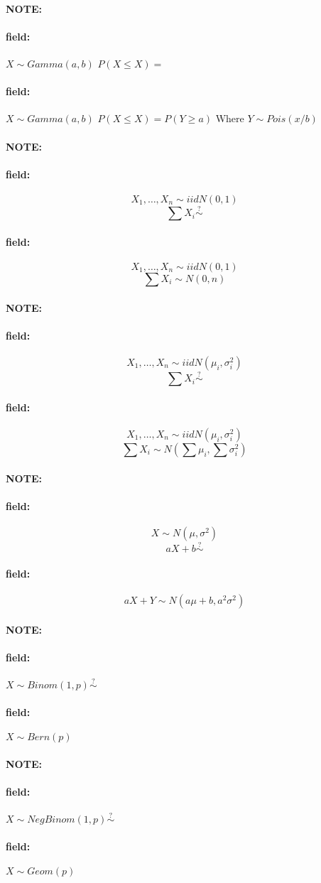 \documentclass[12pt]{article}
\newenvironment{note}{\paragraph{NOTE:}}{}
\newenvironment{field}{\paragraph{field:}}{}
\begin{document}

\begin{note}
  \begin{field}
    $X \sim Gamma(a,b)$
    $P(X \leq X) = $
  \end{field}
  \begin{field}
    $X \sim Gamma(a,b)$
    $P(X \leq X) = P(Y \geq a)$
    Where $Y \sim Pois (x/b)$
  \end{field}
\end{note}


\begin{note}
  \begin{field}
    $$X_1, \ldots, X_n \sim iid N(0,1)$$
    $$ \sum X_i \overset{?}{\sim}$$
  \end{field}
  \begin{field}
    $$X_1, \ldots, X_n \sim iid N(0,1)$$
    $$ \sum X_i \sim N(0,n)$$
  \end{field}
\end{note}
\begin{note}
  \begin{field}
    $$X_1, \ldots, X_n \sim iid N(\mu_i,\sigma_i^2)$$
    $$ \sum X_i \overset{?}{\sim}$$
  \end{field}
  \begin{field}
    $$X_1, \ldots, X_n \sim iid N(\mu_i,\sigma_i^2)$$
    $$ \sum X_i \sim N(\sum \mu_i,\sum \sigma^2_i)$$
  \end{field}
\end{note}
\begin{note}
  \begin{field}
    $$X  \sim N(\mu,\sigma^2)$$
    $$ aX + b \overset{?}{\sim}$$
  \end{field}
  \begin{field}
    $$ aX + Y \sim N(a\mu + b, a^2\sigma^2)$$
  \end{field}
\end{note}

\begin{note}
  \begin{field}
    $X \sim Binom(1,p) \overset{?}{\sim}$
  \end{field}
  \begin{field}
    $X \sim Bern(p)$
  \end{field}
\end{note}

\begin{note}
  \begin{field}
    $X \sim NegBinom(1,p) \overset{?}{\sim}$
  \end{field}
  \begin{field}
    $X \sim Geom(p)$
  \end{field}
\end{note}
\end{document}

